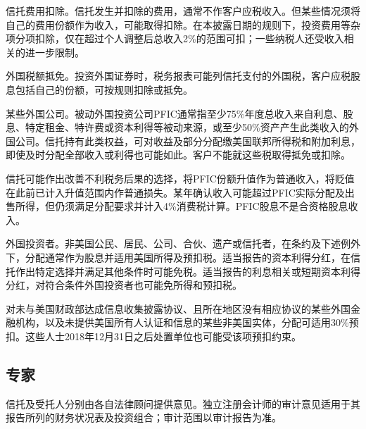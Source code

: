 \documentclass[UTF8,fontset=none,11pt,a4paper]{ctexart}
\begin{document}
信托费用扣除。信托发生并扣除的费用，通常不作客户应税收入。但某些情况须将自己的费用份额作为收入，可能取得扣除。在本披露日期的规则下，投资费用等杂项分项扣除，仅在超过个人调整后总收入2\%的范围可扣；一些纳税人还受收入相关的进\allowbreak\mbox{一步限制。}


外国税额抵免。投资外国证券时，税务报表可能列信托支付的外国税，客户应税股息包括自己的份额，可按规则扣\allowbreak\mbox{除或抵免。}


某些外国公司。被动外国投资公司PFIC通常指至少75\%年度总收入来自利息、股息、特定租金、特许费或资本利得等被动来源，或至少50\%资产产生此类收入的外国公司。信托持有此类权益，可对收益及部分分配缴美国联邦所得税和附加利息，即使及时分配全部收入或利得也可能如此。客户不能就这些税取得抵\allowbreak\mbox{免或扣除。}


信托可能作出改善不利税务后果的选择，将PFIC份额升值作为普通收入，将贬值在此前已计入升值范围内作普通损失。某年确认收入可能超过PFIC实际分配及出售所得，但仍须满足分配要求并计入4\%消费税计算。PFIC股息不是合资格\allowbreak\mbox{股息收入。}


外国投资者。非美国公民、居民、公司、合伙、遗产或信托者，在条约及下述例外下，分配通常作为股息并适用美国所得及预扣税。适当报告的资本利得分红，在信托作出特定选择并满足其他条件时可能免税。适当报告的利息相关或短期资本利得分红，对符合条件外国投资者也可能免所得\allowbreak\mbox{和预扣税。}


对未与美国财政部达成信息收集披露协议、且所在地区没有相应协议的某些外国金融机构，以及未提供美国所有人认证和信息的某些非美国实体，分配可适用30\%预扣。这些人士2018年12月31日之后处置单位也可能受该项\allowbreak\mbox{预扣约束。}


\subsection*{专家}
信托及受托人分别由各自法律顾问提供意见。独立注册会计师的审计意见适用于其报告所列的财务状况表及投资组合；审计范围以审计\allowbreak\mbox{报告为准。}
\end{document}
